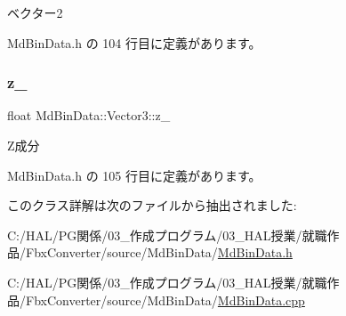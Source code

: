 ベクター2 



 Md\+Bin\+Data.\+h の 104 行目に定義があります。

\mbox{\label{class_md_bin_data_1_1_vector3_a5bf432978dbd9411afe66e69fd8aaaef}} 
\subsubsection{\texorpdfstring{z\+\_\+}{z\_}}
{\footnotesize\ttfamily float Md\+Bin\+Data\+::\+Vector3\+::z\+\_\+\hspace{0.3cm}{\ttfamily [private]}}



Z成分 



 Md\+Bin\+Data.\+h の 105 行目に定義があります。



このクラス詳解は次のファイルから抽出されました\+:\begin{DoxyCompactItemize}
\item 
C\+:/\+H\+A\+L/\+P\+G関係/03\+\_\+作成プログラム/03\+\_\+\+H\+A\+L授業/就職作品/\+Fbx\+Converter/source/\+Md\+Bin\+Data/\mbox{\hyperlink{_md_bin_data_8h}{Md\+Bin\+Data.\+h}}\item 
C\+:/\+H\+A\+L/\+P\+G関係/03\+\_\+作成プログラム/03\+\_\+\+H\+A\+L授業/就職作品/\+Fbx\+Converter/source/\+Md\+Bin\+Data/\mbox{\hyperlink{_md_bin_data_8cpp}{Md\+Bin\+Data.\+cpp}}\end{DoxyCompactItemize}
